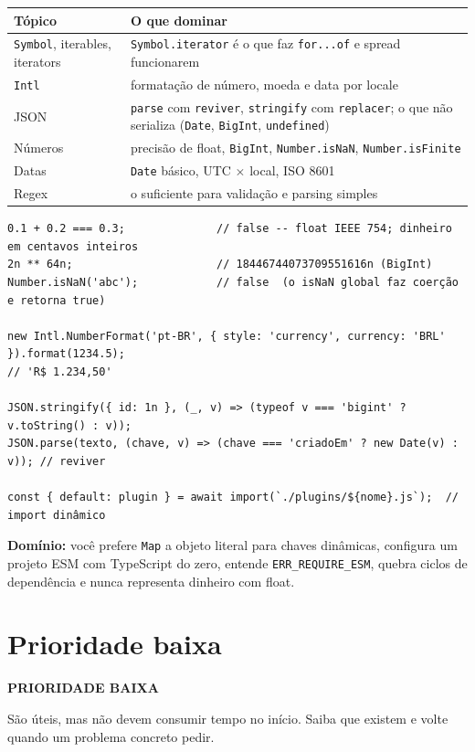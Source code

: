 \documentclass[12pt,a4paper,oneside]{book}
\newcommand{\baixa}{\colorbox{gray!20}{\sffamily\scriptsize\bfseries PRIORIDADE BAIXA}}
\newcommand{\code}[1]{\texttt{#1}}
\newcommand{\dom}[1]{\begin{dominio}\textbf{Domínio:} #1\end{dominio}}
\begin{document}
{\small
\begin{tabularx}{\textwidth}{@{}lX@{}}
\toprule
\textbf{Tópico} & \textbf{O que dominar} \\
\midrule
\code{Symbol}, iterables, iterators & \code{Symbol.iterator} é o que faz \code{for...of} e spread funcionarem \\
\code{Intl} & formatação de número, moeda e data por locale \\
JSON & \code{parse} com \code{reviver}, \code{stringify} com \code{replacer}; o que não serializa (\code{Date}, \code{BigInt}, \code{undefined}) \\
Números & precisão de float, \code{BigInt}, \code{Number.isNaN}, \code{Number.isFinite} \\
Datas & \code{Date} básico, UTC $\times$ local, ISO 8601 \\
Regex & o suficiente para validação e parsing simples \\
\bottomrule
\end{tabularx}
}

\begin{verbatim}
0.1 + 0.2 === 0.3;              // false -- float IEEE 754; dinheiro em centavos inteiros
2n ** 64n;                      // 18446744073709551616n (BigInt)
Number.isNaN('abc');            // false  (o isNaN global faz coerção e retorna true)

new Intl.NumberFormat('pt-BR', { style: 'currency', currency: 'BRL' }).format(1234.5);
// 'R$ 1.234,50'

JSON.stringify({ id: 1n }, (_, v) => (typeof v === 'bigint' ? v.toString() : v));
JSON.parse(texto, (chave, v) => (chave === 'criadoEm' ? new Date(v) : v)); // reviver

const { default: plugin } = await import(`./plugins/${nome}.js`);  // import dinâmico
\end{verbatim}

\dom{você prefere \code{Map} a objeto literal para chaves dinâmicas, configura um projeto ESM com TypeScript do zero, entende \code{ERR\_REQUIRE\_ESM}, quebra ciclos de dependência e nunca representa dinheiro com float.}

\section{Prioridade baixa}
\label{sec:jsbaixa}
\baixa

São úteis, mas não devem consumir tempo no início. Saiba que existem e volte quando um problema concreto pedir.
\end{document}
